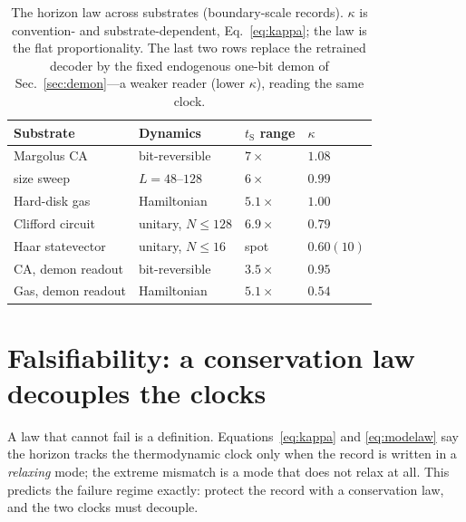\documentclass[aps,pre,twocolumn,superscriptaddress,nofootinbib,longbibliography]{revtex4-2}
\newcommand{\tS}{t_{\mathrm{S}}}
\newcommand{\kap}{\kappa}
\begin{document}
\begin{table}
\caption{The horizon law across substrates (boundary-scale records). $\kap$ is convention-
and substrate-dependent, Eq.~\eqref{eq:kappa}; the law is the flat proportionality. The
last two rows replace the retrained decoder by the fixed endogenous one-bit demon of
Sec.~\ref{sec:demon}---a weaker reader (lower $\kap$), reading the same clock.}
\label{tab:kappa}
\begin{ruledtabular}
\begin{tabular}{llll}
Substrate & Dynamics & $\tS$ range & $\kap$ \\
\hline
Margolus CA        & bit-reversible          & $7\times$   & $1.08$ \\
\quad size sweep   & $L=48$--$128$           & $6\times$   & $0.99$ \\
Hard-disk gas      & Hamiltonian             & $5.1\times$ & $1.00$ \\
Clifford circuit   & unitary, $N\le128$      & $6.9\times$ & $0.79$ \\
Haar statevector   & unitary, $N\le16$       & spot        & $0.60(10)$ \\
\hline
CA, demon readout  & bit-reversible          & $3.5\times$ & $0.95$ \\
Gas, demon readout & Hamiltonian             & $5.1\times$ & $0.54$ \\
\end{tabular}
\end{ruledtabular}
\end{table}

\section{Falsifiability: a conservation law decouples the clocks}
\label{sec:falsification}

A law that cannot fail is a definition. Equations~\eqref{eq:kappa} and \eqref{eq:modelaw}
say the horizon tracks the thermodynamic clock only when the record is written in a
\emph{relaxing} mode; the extreme mismatch is a mode that does not relax at all. This
predicts the failure regime exactly: protect the record with a conservation law, and the
two clocks must decouple.
\end{document}
